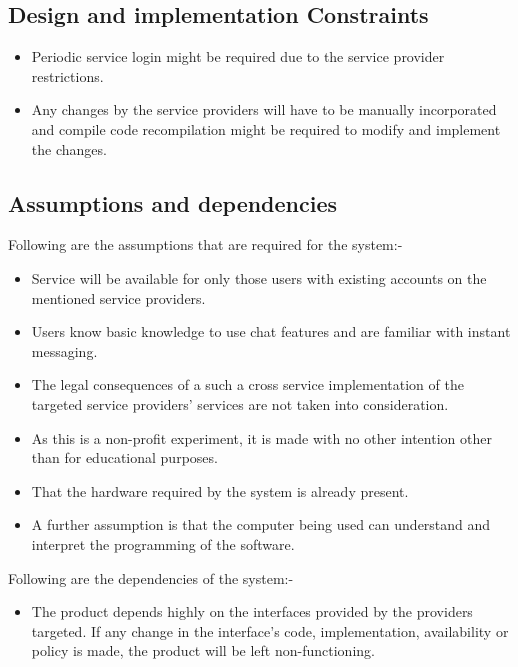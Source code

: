\documentclass{SureshLimkar}
\begin{document}
\subsection{Design and implementation Constraints}
\begin{itemize}
 \item Periodic service login might be required due to the service provider restrictions.
\item Any changes by the service providers will have to be manually incorporated and compile code recompilation might be required to modify and implement the changes.
\end{itemize}
\subsection{Assumptions and dependencies}
Following are the assumptions that are required for the system:-
\begin{itemize}
	\item Service will be available for only those users with existing accounts on the mentioned service providers. 
	\item Users know basic knowledge to use chat features and are familiar with instant messaging.
	\item The legal consequences of a such a cross service implementation of the targeted service providers’ services are not taken into consideration. 
	\item As this is a non-profit experiment, it is made with no other intention other than for educational purposes.
	\item That the hardware required by the system is already present.
	\item A further assumption is that the computer being used can understand and interpret the programming of the software.
\end{itemize}
Following are the dependencies of the system:-
\begin{itemize}
	\item The product depends highly on the interfaces provided by the providers targeted. If any change in the interface’s code, implementation, availability or policy is made, the product will be left non-functioning.
\end{itemize}
\newpage
\end{document}
